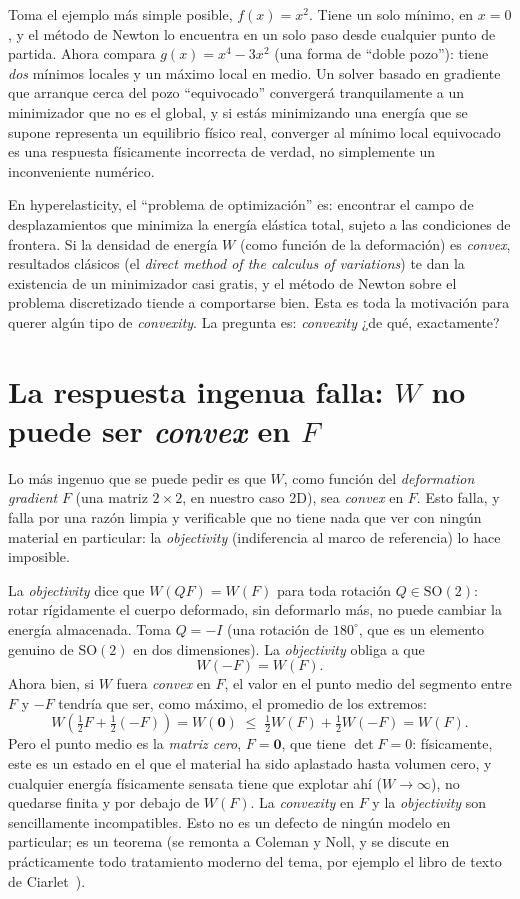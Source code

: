 \documentclass[11pt,a4paper]{article}
\newcommand{\SO}{\mathrm{SO}(2)}
\begin{document}
Toma el ejemplo m\'as simple posible, $f(x)=x^2$. Tiene un solo m\'inimo,
en $x=0$, y el m\'etodo de Newton lo encuentra en un solo paso desde
cualquier punto de partida. Ahora compara $g(x)=x^4-3x^2$ (una forma de
``doble pozo''): tiene \emph{dos} m\'inimos locales y un m\'aximo local
en medio. Un solver basado en gradiente que arranque cerca del pozo
``equivocado'' converger\'a tranquilamente a un minimizador que no es
el global, y si est\'as minimizando una energ\'ia que se supone
representa un equilibrio f\'isico real, converger al m\'inimo local
equivocado es una respuesta f\'isicamente incorrecta de verdad, no
simplemente un inconveniente num\'erico.

En hyperelasticity, el ``problema de optimizaci\'on'' es: encontrar el
campo de desplazamientos que minimiza la energ\'ia el\'astica total,
sujeto a las condiciones de frontera. Si la densidad de energ\'ia $W$
(como funci\'on de la deformaci\'on) es \emph{convex}, resultados
cl\'asicos (el \emph{direct method of the calculus of variations}) te dan
la existencia de un minimizador casi gratis, y el m\'etodo de Newton
sobre el problema discretizado tiende a comportarse bien. Esta es toda
la motivaci\'on para querer alg\'un tipo de \emph{convexity}. La
pregunta es: \emph{convexity} ¿de qu\'e, exactamente?

\section{La respuesta ingenua falla: $W$ no puede ser \emph{convex} en $F$}
\label{sec:naive-fails}

Lo m\'as ingenuo que se puede pedir es que $W$, como funci\'on del
\emph{deformation gradient} $F$ (una matriz $2\times2$, en nuestro caso
2D), sea \emph{convex} en $F$. Esto falla, y falla por una raz\'on
limpia y verificable que no tiene nada que ver con ning\'un material en
particular: la \emph{objectivity} (indiferencia al marco de referencia)
lo hace imposible.

La \emph{objectivity} dice que $W(QF)=W(F)$ para toda rotaci\'on
$Q\in\SO$: rotar r\'igidamente el cuerpo deformado, sin deformarlo m\'as,
no puede cambiar la energ\'ia almacenada. Toma $Q=-I$ (una rotaci\'on de
$180^\circ$, que es un elemento genuino de $\SO$ en dos dimensiones). La
\emph{objectivity} obliga a que
\[
 W(-F)=W(F).
\]
Ahora bien, si $W$ fuera \emph{convex} en $F$, el valor en el punto
medio del segmento entre $F$ y $-F$ tendr\'ia que ser, como m\'aximo,
el promedio de los extremos:
\[
 W\!\left(\tfrac12F+\tfrac12(-F)\right) = W(\bm 0) \;\leq\; \tfrac12W(F)+\tfrac12W(-F) = W(F).
\]
Pero el punto medio es la \emph{matriz cero}, $F=\bm 0$, que tiene
$\det F=0$: f\'isicamente, este es un estado en el que el material ha
sido aplastado hasta volumen cero, y cualquier energ\'ia f\'isicamente
sensata tiene que explotar ah\'i ($W\to\infty$), no quedarse finita y
por debajo de $W(F)$. La \emph{convexity} en $F$ y la \emph{objectivity}
son sencillamente incompatibles. Esto no es un defecto de ning\'un
modelo en particular; es un teorema (se remonta a Coleman y Noll, y se
discute en pr\'acticamente todo tratamiento moderno del tema, por
ejemplo el libro de texto de Ciarlet~\cite{Ciarlet1988}).
\end{document}
